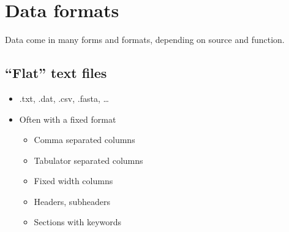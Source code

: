 \documentclass[letterpaper,10pt,english]{jupyterBook}
\begin{document}
\sphinxstepscope


\section{Data formats}
\label{\detokenize{2_Data_sources/Formats/Data_formats:data-formats}}\label{\detokenize{2_Data_sources/Formats/Data_formats::doc}}
\sphinxAtStartPar
Data come in many forms and formats, depending on source and function.


\subsection{“Flat” text files}
\label{\detokenize{2_Data_sources/Formats/Data_formats:flat-text-files}}\begin{itemize}
\item {} 
\sphinxAtStartPar
.txt, .dat, .csv, .fasta, …

\item {} 
\sphinxAtStartPar
Often with a fixed format
\begin{itemize}
\item {} 
\sphinxAtStartPar
Comma separated columns

\item {} 
\sphinxAtStartPar
Tabulator separated columns

\item {} 
\sphinxAtStartPar
Fixed width columns

\item {} 
\sphinxAtStartPar
Headers, subheaders

\item {} 
\sphinxAtStartPar
Sections with keywords

\end{itemize}

\end{itemize}
\end{document}
